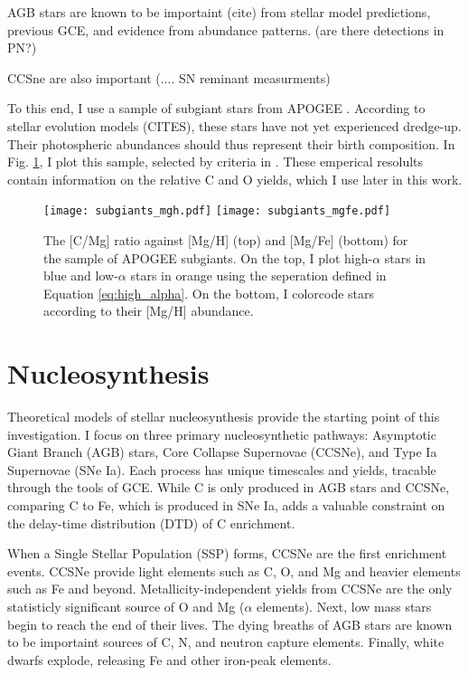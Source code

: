 \documentclass[12pt,oneside]{report}
\begin{document}
AGB stars are known to be importaint (cite) from stellar model predictions, previous GCE, and evidence from abundance patterns. (are there detections in PN?)

CCSne are also important (.... SN reminant measurments)

To this end, I use a sample of subgiant stars from APOGEE \citep{apogee17}. According to stellar evolution models (CITES), these stars have not yet experienced dredge-up. Their photospheric abundances should thus represent their birth composition.  In Fig. \ref{fig:subgiants}, I plot this sample, selected by criteria in \citet[see Appendix \ref{sec:jack}]{jack_subgiant}. These emperical resolults contain information on the relative C and O yields, which I use later in this work.


\begin{figure}[htp]
    \texttt{[image: subgiants\_mgh.pdf]}
    \texttt{[image: subgiants\_mgfe.pdf]}
    \caption[APOGEE Subgiants]{The [C/Mg] ratio against [Mg/H] (top) and [Mg/Fe] (bottom) for the \citet{jack_subgiant} sample of APOGEE subgiants. On the top, I plot high-$\alpha$ stars in blue and low-$\alpha$ stars in orange using the seperation defined in Equation \ref{eq:high_alpha}. On the bottom, I colorcode stars according to their [Mg/H] abundance.}
    \label{fig:subgiants}
\end{figure}
\chapter{Nucleosynthesis}

Theoretical models of stellar nucleosynthesis provide the starting point of this investigation. I focus on three primary nucleosynthetic pathways: Asymptotic Giant Branch (AGB) stars, Core Collapse Supernovae (CCSNe), and Type Ia Supernovae (SNe Ia). Each process has unique timescales and yields, tracable through the tools of GCE. While C is only produced in AGB stars and CCSNe, comparing C to Fe, which is produced in SNe Ia, adds a valuable constraint on the delay-time distribution (DTD) of C enrichment.

When a Single Stellar Population (SSP) forms, CCSNe are the first enrichment events. CCSNe provide light elements such as C, O, and Mg and heavier elements such as Fe and beyond. Metallicity-independent yields from CCSNe are the only statisticly significant source of O and Mg ($\alpha$ elements). Next, low mass stars begin to reach the end of their lives. The dying breaths of AGB stars are known to be importaint sources of C, N, and neutron capture elements.  Finally, white dwarfs explode, releasing Fe and other iron-peak elements.
\end{document}
